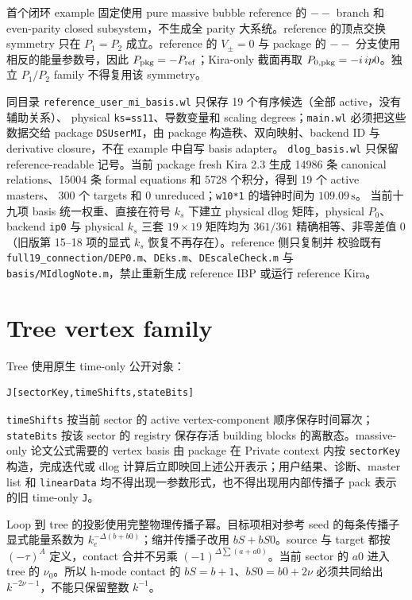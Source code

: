 ﻿\documentclass[a4paper,11pt]{article}
\begin{document}
首个闭环 example 固定使用 pure massive bubble reference 的 $--$ branch 和 even-parity closed subsystem，不生成全 parity 大系统。reference 的顶点交换 symmetry 只在 $P_1=P_2$ 成立。reference 的 $V_{\pm}=0$ 与 package 的 $--$ 分支使用相反的能量参数号，因此 $P_{\rm pkg}=-P_{\rm ref}$；Kira-only 截面再取 $P_{0,\rm pkg}=-i\,ip0$。独立 $P_1/P_2$ family 不得复用该 symmetry。

同目录 \texttt{reference\_user\_mi\_basis.wl} 只保存 19 个有序候选（全部 active，没有辅助关系）、
physical \texttt{ks=ss11}、导数变量和 scaling degrees；\texttt{main.wl} 必须把这些数据交给 package \texttt{DSUserMI}，由 package 构造秩、双向映射、backend ID 与 derivative closure，不在 example 中自写 basis adapter。
\texttt{dlog\_basis.wl} 只保留 reference-readable 记号。当前 package fresh Kira 2.3 生成
14986 条 canonical relations、15004 条 formal equations 和 5728 个积分，得到 19 个 active masters、
300 个 targets 和 0 unreduced；\texttt{w10*1} 的墙钟时间为 $109.09\,\mathrm{s}$。
当前十九项 basis 统一权重、直接在符号 $k_s$ 下建立 physical dlog 矩阵，physical $P_0$、backend \texttt{ip0}
与 physical $k_s$ 三套 $19\times19$ 矩阵均为 $361/361$ 精确相等、非零差值 0（旧版第 15--18 项的显式 $k_s$ 恢复不再存在）。reference 侧只复制并
校验既有 \texttt{full19\_connection/DEP0.m}、\texttt{DEks.m}、\texttt{DEscaleCheck.m} 与 \texttt{basis/MIdlogNote.m}，禁止重新生成
reference IBP 或运行 reference Kira。

\section{Tree vertex family}

Tree 使用原生 time-only 公开对象：
\begin{verbatim}
J[sectorKey,timeShifts,stateBits]
\end{verbatim}
\texttt{timeShifts} 按当前 sector 的 active vertex-component 顺序保存时间幂次；\texttt{stateBits} 按该 sector 的 registry 保存存活 building blocks 的离散态。massive-only 论文公式需要的 vertex basis 由 package 在 Private context 内按 \texttt{sectorKey} 构造，完成迭代或 dlog 计算后立即映回上述公开表示；用户结果、诊断、master list 和 \texttt{linearData} 均不得出现一参数形式，也不得出现用内部传播子 pack 表示的旧 time-only \texttt{J}。

Loop 到 tree 的投影使用完整物理传播子幂。目标项相对参考 seed 的每条传播子显式能量系数为 $k_e^{-\Delta(b+b0)}$；缩并传播子改用 $bS+bS0$。source 与 target 都按 $(-\tau)^A$ 定义，contact 合并不另乘 $(-1)^{\Delta\sum(a+a0)}$。当前 sector 的 $a0$ 进入 tree 的 $\nu_0$。所以 h-mode contact 的 $bS=b+1$、$bS0=b0+2\nu$ 必须共同给出 $k^{-2\nu-1}$，不能只保留整数 $k^{-1}$。
\end{document}
